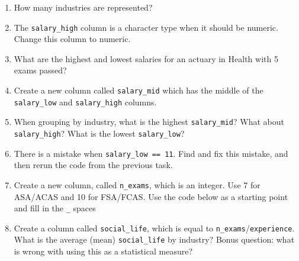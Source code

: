 \documentclass[
  openany]{book}
\newenvironment{Shaded}{\begin{snugshade}}{\end{snugshade}}
\newcommand{\DataTypeTok}[1]{\textcolor[rgb]{0.13,0.29,0.53}{#1}}
\newcommand{\KeywordTok}[1]{\textcolor[rgb]{0.13,0.29,0.53}{\textbf{#1}}}
\newcommand{\NormalTok}[1]{#1}
\newcommand{\OperatorTok}[1]{\textcolor[rgb]{0.81,0.36,0.00}{\textbf{#1}}}
\newcommand{\OtherTok}[1]{\textcolor[rgb]{0.56,0.35,0.01}{#1}}
\newcommand{\StringTok}[1]{\textcolor[rgb]{0.31,0.60,0.02}{#1}}
\providecommand{\tightlist}{%
  \setlength{\itemsep}{0pt}\setlength{\parskip}{0pt}}
\begin{document}
\begin{enumerate}
\def\labelenumi{\arabic{enumi}.}
\tightlist
\item
  How many industries are represented?
\item
  The \texttt{salary\_high} column is a character type when it should be numeric. Change this column to numeric.
\item
  What are the highest and lowest salaries for an actuary in Health with 5 exams passed?
\item
  Create a new column called \texttt{salary\_mid} which has the middle of the \texttt{salary\_low} and \texttt{salary\_high} columns.
\item
  When grouping by industry, what is the highest \texttt{salary\_mid}? What about \texttt{salary\_high}? What is the lowest \texttt{salary\_low}?
\item
  There is a mistake when \texttt{salary\_low\ ==\ 11}. Find and fix this mistake, and then rerun the code from the previous task.
\item
  Create a new column, called \texttt{n\_exams}, which is an integer. Use 7 for ASA/ACAS and 10 for FSA/FCAS. Use the code below as a starting point and fill in the \texttt{\_} spaces
\item
  Create a column called \texttt{social\_life}, which is equal to \texttt{n\_exams}/\texttt{experience}. What is the average (mean) \texttt{social\_life} by industry? Bonus question: what is wrong with using this as a statistical measure?
\end{enumerate}

\begin{Shaded}
\end{Shaded}
\end{document}
